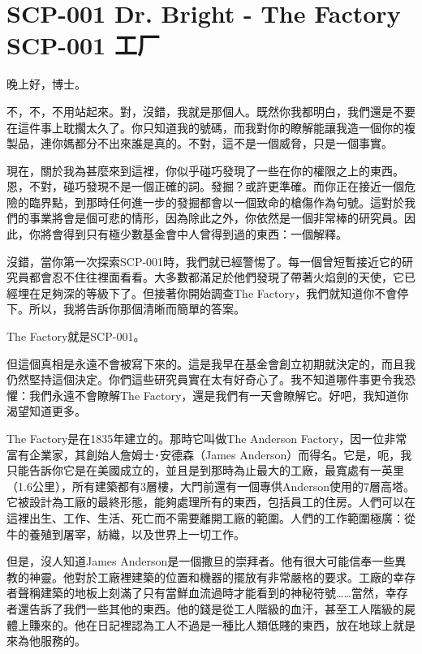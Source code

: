 \chapter[SCP-001 工厂]{
	SCP-001 Dr. Bright - The Factory \\ 
	SCP-001 工厂
}

\label{chap:SCP-001.the.factory}


晚上好，博士。

不，不，不用站起來。對，沒錯，我就是那個人。既然你我都明白，我們還是不要在這件事上耽擱太久了。你只知道我的號碼，而我對你的瞭解能讓我造一個你的複製品，連你媽都分不出來誰是真的。不對，這不是一個威脅，只是一個事實。

現在，關於我為甚麼來到這裡，你似乎碰巧發現了一些在你的權限之上的東西。恩，不對，碰巧發現不是一個正確的詞。發掘？或許更準確。而你正在接近一個危險的臨界點，到那時任何進一步的發掘都會以一個致命的槍傷作為句號。這對於我們的事業將會是個可悲的情形，因為除此之外，你依然是一個非常棒的研究員。因此，你將會得到只有極少數基金會中人曾得到過的東西：一個解釋。

沒錯，當你第一次探索SCP-001時，我們就已經警惕了。每一個曾短暫接近它的研究員都會忍不住往裡面看看。大多數都滿足於他們發現了帶著火焰劍的天使，它已經埋在足夠深的等級下了。但接著你開始調查The Factory，我們就知道你不會停下。所以，我將告訴你那個清晰而簡單的答案。

The Factory就是SCP-001。

但這個真相是永遠不會被寫下來的。這是我早在基金會創立初期就決定的，而且我仍然堅持這個決定。你們這些研究員實在太有好奇心了。我不知道哪件事更令我恐懼：我們永遠不會瞭解The Factory，還是我們有一天會瞭解它。好吧，我知道你渴望知道更多。

The Factory是在1835年建立的。那時它叫做The Anderson Factory，因一位非常富有企業家，其創始人詹姆士･安德森（James Anderson）而得名。它是，呃，我只能告訴你它是在美國成立的，並且是到那時為止最大的工廠，最寬處有一英里（1.6公里），所有建築都有3層樓，大門前還有一個專供Anderson使用的7層高塔。它被設計為工廠的最終形態，能夠處理所有的東西，包括員工的住房。人們可以在這裡出生、工作、生活、死亡而不需要離開工廠的範圍。人們的工作範圍極廣：從牛的養殖到屠宰，紡織，以及世界上一切工作。

但是，沒人知道James Anderson是一個撒旦的崇拜者。他有很大可能信奉一些異教的神靈。他對於工廠裡建築的位置和機器的擺放有非常嚴格的要求。工廠的幸存者聲稱建築的地板上刻滿了只有當鮮血流過時才能看到的神秘符號……當然，幸存者還告訴了我們一些其他的東西。他的錢是從工人階級的血汗，甚至工人階級的屍體上賺來的。他在日記裡認為工人不過是一種比人類低賤的東西，放在地球上就是來為他服務的。

